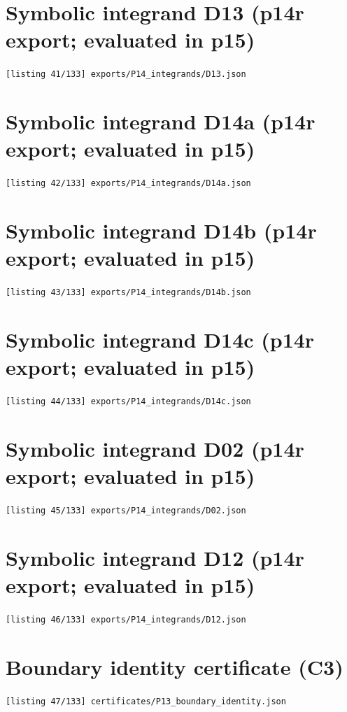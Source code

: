 \section{Symbolic integrand D13 (p14r export; evaluated in p15)}
\noindent\texttt{[listing 41/133] exports/P14\_integrands/D13.json}
{\scriptsize}

\section{Symbolic integrand D14a (p14r export; evaluated in p15)}
\noindent\texttt{[listing 42/133] exports/P14\_integrands/D14a.json}
{\scriptsize}

\section{Symbolic integrand D14b (p14r export; evaluated in p15)}
\noindent\texttt{[listing 43/133] exports/P14\_integrands/D14b.json}
{\scriptsize}

\section{Symbolic integrand D14c (p14r export; evaluated in p15)}
\noindent\texttt{[listing 44/133] exports/P14\_integrands/D14c.json}
{\scriptsize}

\section{Symbolic integrand D02 (p14r export; evaluated in p15)}
\noindent\texttt{[listing 45/133] exports/P14\_integrands/D02.json}
{\scriptsize}

\section{Symbolic integrand D12 (p14r export; evaluated in p15)}
\noindent\texttt{[listing 46/133] exports/P14\_integrands/D12.json}
{\scriptsize}

\section{Boundary identity certificate (C3)}
\noindent\texttt{[listing 47/133] certificates/P13\_boundary\_identity.json}
{\scriptsize}

